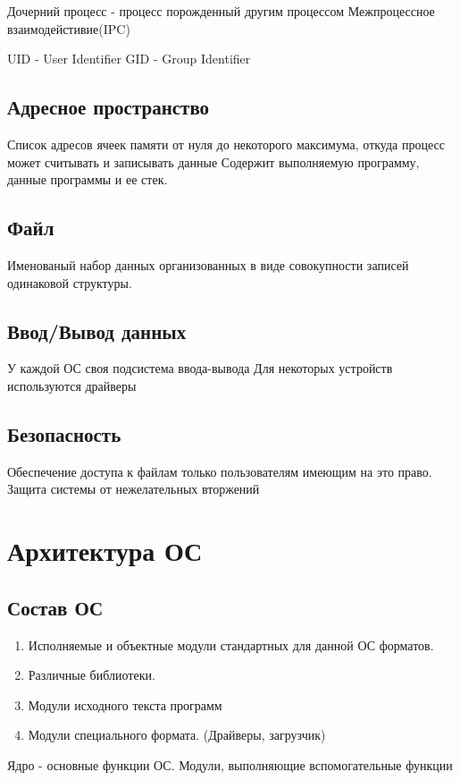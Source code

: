 \documentclass[a4paper]{article}
\begin{document}
Дочерний процесс - процесс порожденный другим процессом
Межпроцессное взаимодейстивие(IPC)

UID - User Identifier
GID - Group Identifier

\subsection{Адресное пространство}
Список адресов ячеек памяти от нуля до некоторого максимума, откуда процесс может считывать и записывать данные 
Содержит выполняемую программу, данные программы и ее стек.

\subsection{Файл}
Именованый набор данных организованных в виде совокупности записей одинаковой структуры.


\subsection{Ввод/Вывод данных}
У каждой ОС своя подсистема ввода-вывода
Для некоторых устройств используются драйверы

\subsection{Безопасность}
Обеспечение доступа к файлам только пользователям имеющим на это право. Защита системы от нежелательных вторжений

\section{Архитектура ОС}

\subsection{Состав ОС}

\begin{enumerate}
\item Исполняемые и объектные модули стандартных для данной ОС форматов.
\item Различные библиотеки.
\item Модули исходного текста программ
\item Модули специального формата. (Драйверы, загрузчик)
\end{enumerate}

Ядро - основные функции ОС.
Модули, выполняющие вспомогательные функции
\end{document}
